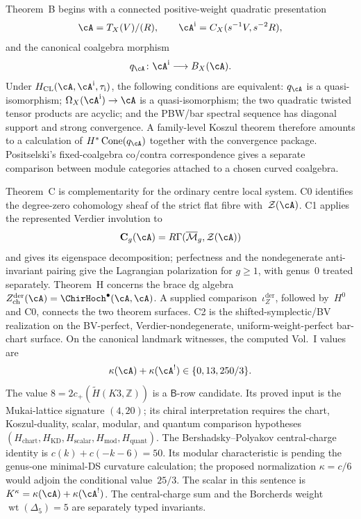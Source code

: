 Theorem~B begins with a connected positive-weight quadratic
presentation
\[
 \cA=T_X(V)/(R),
 \qquad
 \cA^{\mathrm i}=C_X(s^{-1}V,s^{-2}R),
\]
and the canonical coalgebra morphism
\[
 q_\cA\colon\cA^{\mathrm i}\longrightarrow B_X(\cA).
\]
Under \(H_{\mathrm{CL}}(\cA,\cA^{\mathrm i},\tau_{\mathrm i})\), the
following conditions are equivalent: \(q_\cA\) is a
quasi-isomorphism; \(\Omega_X(\cA^{\mathrm i})\to\cA\) is a
quasi-isomorphism; the two quadratic twisted tensor products are
acyclic; and the PBW/bar spectral sequence has diagonal support and
strong convergence.  A family-level Koszul theorem therefore amounts
to a calculation of
\(H^*\operatorname{Cone}(q_\cA)\) together with the convergence
package.  Positselski's fixed-coalgebra co/contra correspondence gives
a separate comparison between module categories attached to a chosen
curved coalgebra.

Theorem~C is complementarity for the ordinary centre local system.
C0 identifies the degree-zero cohomology sheaf of the strict flat fibre
with~$\mathcal Z(\cA)$.  C1 applies the represented Verdier involution to
\[
 \mathbf C_g(\cA)
 =R\Gamma(\overline{\mathcal M}_g,\mathcal Z(\cA))
\]
and gives its eigenspace decomposition; perfectness and the
nondegenerate anti-invariant pairing give the Lagrangian polarization
for $g\ge1$, with genus~$0$ treated separately.  Theorem~H concerns the
brace dg algebra
$Z^{\mathrm{der}}_{\mathrm{ch}}(\cA)=\ChirHoch^\bullet(\cA,\cA)$.
A supplied comparison~$\iota_Z^{\mathrm{der}}$, followed by~$H^0$ and
C0, connects the two theorem surfaces.  C2 is the shifted-symplectic/BV
realization on the BV-perfect, Verdier-nondegenerate,
uniform-weight-perfect bar-chart surface. On the
canonical landmark witnesses, the computed Vol.~I values are
\[
 \kappa(\cA)+\kappa(\cA^!)
 \in\{0,13,250/3\}.
\]
The value $8=2c_+(\widetilde H(K3,\mathbb Z))$ is a
\ClaimStatusConjectured{} $\mathsf B$-row candidate.  Its proved input
is the Mukai-lattice signature $(4,20)$; its chiral interpretation
requires the chart, Koszul-duality, scalar, modular, and quantum
comparison hypotheses $(H_{\mathrm{chart}},H_{\mathrm{KD}},
H_{\mathrm{scalar}},H_{\mathrm{mod}},H_{\mathrm{quant}})$.  The
Bershadsky--Polyakov central-charge identity is
$c(k)+c(-k-6)=50$.  Its modular characteristic is
\ClaimStatusOpen{} pending the genus-one minimal-DS curvature
calculation; the proposed normalization $\kappa=c/6$ would adjoin the
conditional value~$25/3$.  The scalar in this sentence is
$K^\kappa=\kappa(\cA)+\kappa(\cA^!)$.  The central-charge sum and the
Borcherds weight $\operatorname{wt}(\Delta_5)=5$ are separately typed
invariants.

